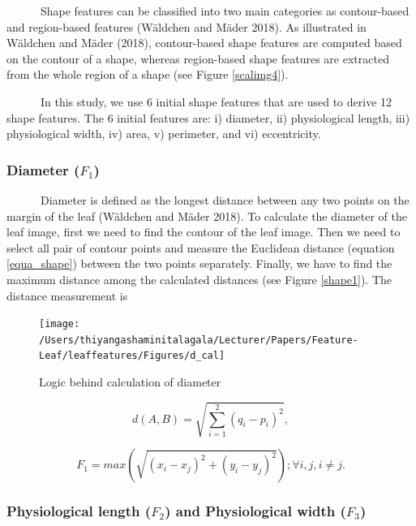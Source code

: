 \documentclass{article}
\begin{document}
~~~~~~Shape features can be classified into two main categories as
contour-based and region-based features (Wäldchen and Mäder 2018). As
illustrated in Wäldchen and Mäder (2018), contour-based shape features
are computed based on the contour of a shape, whereas region-based shape
features are extracted from the whole region of a shape (see Figure
\ref{scalimg4}).

~~~~~~In this study, we use 6 initial shape features that are used to
derive 12 shape features. The 6 initial features are: i) diameter, ii)
physiological length, iii) physiological width, iv) area, v) perimeter,
and vi) eccentricity.

\hypertarget{diameter-f_1}{%
\subsubsection{\texorpdfstring{Diameter
(\(F_1\))}{Diameter (F\_1)}}\label{diameter-f_1}}

~~~~~~Diameter is defined as the longest distance between any two points
on the margin of the leaf (Wäldchen and Mäder 2018). To calculate the
diameter of the leaf image, first we need to find the contour of the
leaf image. Then we need to select all pair of contour points and
measure the Euclidean distance (equation \ref{equa_shape}) between the
two points separately. Finally, we have to find the maximum distance
among the calculated distances (see Figure \ref{shape1}). The distance
measurement is

\begin{figure}[!ht]

{\centering \texttt{[image: /Users/thiyangashaminitalagala/Lecturer/Papers/Feature-Leaf/leaffeatures/Figures/d\_cal]} 

}

\caption{\label{shape1}Logic behind calculation of diameter}\label{fig:unnamed-chunk-14}
\end{figure}

\begin{equation}
    d\left( A,B\right)   = \sqrt {\sum _{i=1}^{2}  \left( q_{i}-p_{i}\right)^2},
\label{equa_shape}
\end{equation}

\begin{equation}
   F_1 = max(\sqrt{(x_i-x_j)^2 + (y_i-y_j)^2}); \forall i,j, i \neq j.
\label{equa_F1}
\end{equation}

\hypertarget{physiological-length-f_2-and-physiological-width-f_3}{%
\subsubsection{\texorpdfstring{Physiological length (\(F_2\)) and
Physiological width
(\(F_3\))}{Physiological length (F\_2) and Physiological width (F\_3)}}\label{physiological-length-f_2-and-physiological-width-f_3}}
\end{document}
